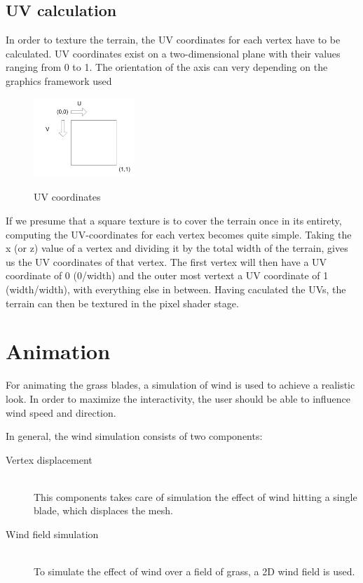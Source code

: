 \documentclass[conference]{acmsiggraph}
\begin{document}
\subsection{UV calculation}
In order to texture the terrain, the UV coordinates for each vertex have to be calculated. UV coordinates exist on a two-dimensional plane with their values ranging from 0 to 1. The orientation of the axis can very depending on the graphics framework used

 \begin{figure}[ht]
   \centering
   \includegraphics[width=1.5in]{images/terrain_uv}
   \caption{UV coordinates} \cite{TerrainUVs}
 \end{figure}

If we presume that a square texture is to cover the terrain once in its entirety, computing the UV-coordinates for each vertex becomes quite simple. Taking the x (or z) value of a vertex and dividing it by the total width of the terrain, gives us the UV coordinates of that vertex. The first vertex will then have a UV coordinate of 0 (0/width) and the outer most vertext a UV coordinate of 1 (width/width), with everything else in between. Having caculated the UVs, the terrain can then be textured in the pixel shader stage.

\section{Animation}
For animating the grass blades, a simulation of wind is used to achieve a realistic look. In order to maximize the interactivity, the user should be able to influence wind speed and direction. 

In general, the wind simulation consists of two components:

\begin{description}
  \item[Vertex displacement] \hfill \\
  This components takes care of simulation the effect of wind hitting a single blade, which displaces the mesh.
  \item[Wind field simulation] \hfill \\
  To simulate the effect of wind over a field of grass, a 2D wind field is used.
\end{description}
\end{document}
